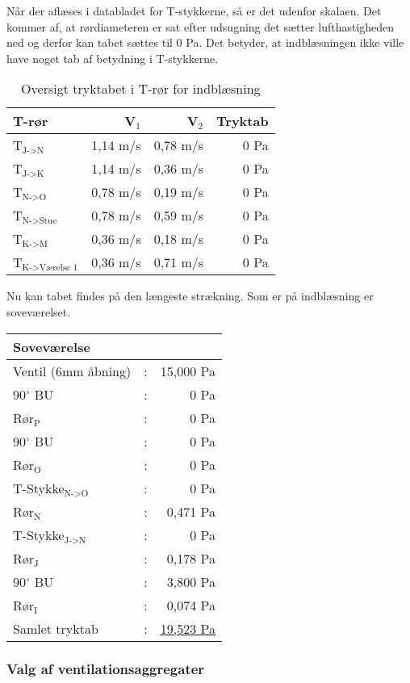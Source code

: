 Når der aflæses i databladet for T-stykkerne, så er det udenfor skalaen.
Det kommer af, at rørdiameteren er sat efter udsugning det sætter lufthastigheden ned og derfor kan tabet sættes til 0 Pa.
Det betyder, at indblæsningen ikke ville have noget tab af betydning i T-stykkerne.
\begin{table}[h!]
    \begin{center}
       \begin{tabular}{|l|r|r|r|}
           \hline
           T-rør & V$_{1}$ & V$_{2}$ & Tryktab \\
           \hline
           T$_{\text{J->N}}$ & 1,14 m/s & 0,78 m/s & 0 Pa \\ 
           T$_{\text{J->K}}$ & 1,14 m/s & 0,36 m/s & 0 Pa \\ 
           T$_{\text{N->O}}$ & 0,78 m/s & 0,19 m/s & 0 Pa \\ 
           T$_{\text{N->Stue}}$ & 0,78 m/s & 0,59 m/s & 0 Pa \\ 
           T$_{\text{K->M}}$ & 0,36 m/s & 0,18 m/s & 0 Pa \\ 
           T$_{\text{K->Værelse 1}}$ & 0,36 m/s & 0,71 m/s & 0 Pa \\ 
           \hline
       \end{tabular}
   \end{center}
   \caption{Oversigt tryktabet i T-rør for indblæsning}
   \label{table:oversigt_tryktab_t-roer_ind}
\end{table}
Nu kan tabet findes på den længeste strækning. Som er på indblæsning er soveværelset.
\begin{table}[h!]
    \begin{center}
       \begin{tabular}{lcr}
           \hline
           \hline
           \textbf{Soveværelse} &  & \\
           \hline
           \hline
           Ventil (6mm åbning) & : & 15,000 Pa \\
           90$^\circ$ BU    & : & 0 Pa \\
           Rør$_{\text{P}}$ & : & 0 Pa \\
           90$^\circ$ BU    & : & 0 Pa \\
           Rør$_{\text{O}}$ & : & 0 Pa \\
           T-Stykke$_{\text{N->O}}$  & : & 0 Pa\\
           Rør$_{\text{N}}$ & : & 0,471 Pa \\
           T-Stykke$_{\text{J->N}}$  & : & 0 Pa\\
           Rør$_{\text{J}}$ & : & 0,178 Pa \\
           90$^\circ$ BU    & : & 3,800 Pa \\
           Rør$_{\text{I}}$ & : & 0,074 Pa \\
           \hline
           Samlet tryktab & : & \underline{\underline{ 19,523 Pa}} 
       \end{tabular}
   \end{center}
\end{table}

\subsubsection{Valg af ventilationsaggregater}
